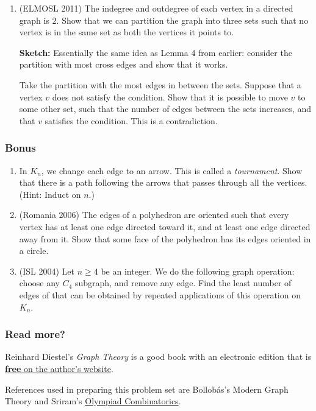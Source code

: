 \documentclass[11pt,paper=letter]{scrartcl}
\begin{document}
\begin{enumerate}
  \item (ELMOSL 2011) The indegree and outdegree of each vertex in a directed graph is $2$. Show that we can partition the graph into three sets such that no vertex is in the same set as both the vertices it points to.

  \textbf{Sketch:} Essentially the same idea as Lemma 4 from earlier: consider the partition with most cross edges and show that it works.

  Take the partition with the most edges in between the sets. Suppose that a vertex $v$ does not satisfy the condition. Show that it is possible to move $v$ to some other set, such that the number of edges between the sets increases, and that $v$ satisfies the condition. This is a contradiction.
\end{enumerate}

\subsubsection*{Bonus}

\begin{enumerate}
  \item In $K_n$, we change each edge to an arrow. This is called a \emph{tournament}. Show that there is a path following the arrows that passes through all the vertices. (Hint: Induct on $n$.)

  \item (Romania 2006) The edges of a polyhedron are oriented such that every vertex has at least one edge directed toward it, and at least one edge directed away from it. Show that some face of the polyhedron has its edges oriented in a circle.

  \item (ISL 2004) Let $n \ge 4$ be an integer. We do the following graph operation: choose any $C_4$ subgraph, and remove any edge. Find the least number of edges of that can be obtained by repeated applications of this operation on $K_n$.
\end{enumerate}

\subsubsection*{Read more?}

Reinhard Diestel's \emph{Graph Theory} is a good book with an electronic edition that is \href{http://www.esi2.us.es/~mbilbao/pdffiles/DiestelGT.pdf}{\textbf{free} on the author's website}. 

References used in preparing this problem set are Bollob\'as's Modern Graph Theory and Sriram's \href{https://artofproblemsolving.com/community/c6h601134}{Olympiad Combinatorics}.
\end{document}
